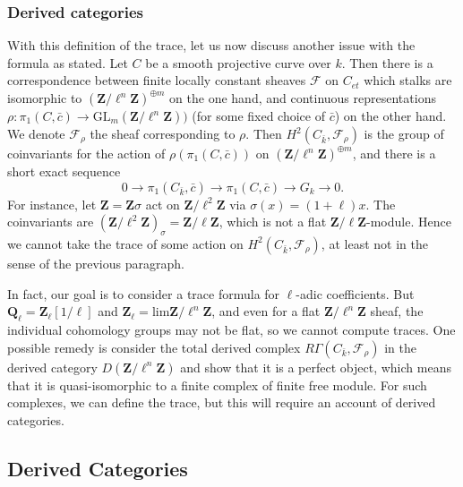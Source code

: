 \subsubsection*{Derived categories}

With this definition of the trace, let us now discuss another issue with the formula as stated. Let $C$ be a smooth projective curve over $k$. Then there is a correspondence between finite locally constant sheaves $\mathcal{F}$ on $C_{et}$ which stalks are isomorphic to ${(\mathbf{Z}/\ell^n\mathbf{Z})}^{\oplus m}$ on the one hand, and continuous representations $\rho : \pi_1 (C,\bar c) \to \text{GL}_m(\mathbf{Z}/\ell^n\mathbf{Z}))$ (for some fixed choice of $\bar c$) on the other hand. We denote $\mathcal{F}_\rho$ the sheaf corresponding to $\rho$. Then $H^2 (C_{\bar k}, \mathcal{F}_\rho)$ is the group of coinvariants for the action of $\rho(\pi_1 (C,\bar c))$ on ${(\mathbf{Z}/\ell^n\mathbf{Z})}^{\oplus m}$, and there is a short exact sequence
$$
0 \longrightarrow \pi_1 (C_{\bar k},\bar c)  \longrightarrow \pi_1 (C,\bar c)  \longrightarrow G_k  \longrightarrow 0.
$$
For instance, let $\mathbf{Z} = \mathbf{Z} \sigma$ act on $\mathbf{Z}/\ell^2\mathbf{Z}$ via $\sigma(x) = (1+\ell) x$. The coinvariants are $(\mathbf{Z}/\ell^2\mathbf{Z})_{\sigma} = \mathbf{Z}/\ell\mathbf{Z}$, which is not a flat $\mathbf{Z}/\ell\mathbf{Z}$-module. Hence we cannot take the trace of some action on $H^2(C_{\bar k}, \mathcal{F}_\rho)$, at least not in the sense of the previous paragraph. 

In fact, our goal is to consider a trace formula for $\ell$-adic coefficients. But $\mathbf{Q}_\ell = \mathbf{Z}_\ell[1/\ell]$ and $\mathbf{Z}_\ell = \text{lim} \mathbf{Z}/\ell^n\mathbf{Z}$, and even for a flat $\mathbf{Z}/\ell^n\mathbf{Z}$ sheaf, the individual cohomology groups may not be flat, so we cannot compute traces. One possible remedy is consider the total derived complex $R\Gamma(C_{\bar k}, \mathcal{F}_\rho)$ in the derived category $D(\mathbf{Z}/\ell^n\mathbf{Z})$ and show that it is a perfect object, which means that it is quasi-isomorphic to a finite complex of finite free module. For such complexes, we can define the trace, but this will require an account of derived categories.

\subsection{Derived Categories}

